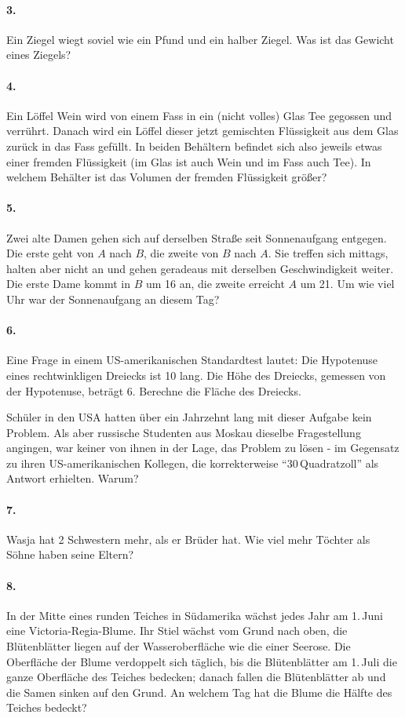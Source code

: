 \documentclass[10pt,a5paper,twoside]{article}
\newenvironment{problem}[1]{\paragraph*{#1}}{}
\begin{document}
\begin{problem}{3.}
	Ein Ziegel wiegt soviel wie ein Pfund und ein halber Ziegel. Was ist das Gewicht eines Ziegels?
\end{problem}

\begin{problem}{4.}
	Ein Löffel Wein wird von einem Fass in ein (nicht volles) Glas Tee gegossen und verrührt. Danach wird ein Löffel dieser jetzt gemischten Flüssigkeit aus dem Glas zurück in das Fass gefüllt. In beiden Behältern befindet sich also jeweils etwas einer fremden Flüssigkeit (im Glas ist auch Wein und im Fass auch Tee). In welchem Behälter ist das Volumen der fremden Flüssigkeit größer?
\end{problem}

\begin{problem}{5.}
	Zwei alte Damen gehen sich auf derselben Straße seit Sonnenaufgang entgegen. Die erste geht von $A$ nach $B$, die zweite von $B$ nach $A$. Sie treffen sich mittags, halten aber nicht an und gehen geradeaus mit derselben Geschwindigkeit weiter. Die erste Dame kommt in $B$ um \SI{16}{\uhr} an, die zweite erreicht $A$ um \SI{21}{\uhr}. Um wie viel Uhr war der Sonnenaufgang an diesem Tag?
\end{problem}

\begin{problem}{6.}
	Eine Frage in einem US-amerikanischen Standardtest lautet: Die Hypotenuse eines rechtwinkligen Dreiecks ist \SI{10}{\zoll} lang. Die Höhe des Dreiecks, gemessen von der Hypotenuse, beträgt \SI{6}{\zoll}. Berechne die Fläche des Dreiecks.

	Schüler in den USA hatten über ein Jahrzehnt lang mit dieser Aufgabe kein Problem. Als aber russische Studenten aus Moskau dieselbe Fragestellung angingen, war keiner von ihnen in der Lage, das Problem zu lösen - im Gegensatz zu ihren US-amerikanischen Kollegen, die korrekterweise \enquote{30\,Quadratzoll} als Antwort erhielten. Warum?
\end{problem}

\begin{problem}{7.}
	Wasja hat 2 Schwestern mehr, als er Brüder hat. Wie viel mehr Töchter als Söhne haben seine Eltern?
\end{problem}

\begin{problem}{8.}
	In der Mitte eines runden Teiches in Südamerika wächst jedes Jahr am 1.\,Juni eine Victoria-Regia-Blume. Ihr Stiel wächst vom Grund nach oben, die Blütenblätter liegen auf der Wasseroberfläche wie die einer Seerose. Die Oberfläche der Blume verdoppelt sich täglich, bis die Blütenblätter am 1.\,Juli die ganze Oberfläche des Teiches bedecken; danach fallen die Blütenblätter ab und die Samen sinken auf den Grund. An welchem Tag hat die Blume die Hälfte des Teiches bedeckt? 
\end{problem}
\end{document}
